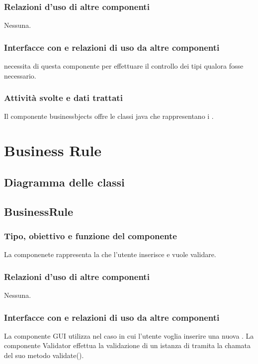\documentclass[11pt,titlepage,a4paper]{report}
\begin{document}
\subsubsection{Relazioni d'uso di altre componenti}
Nessuna.
\subsubsection{Interfacce con e relazioni di uso da altre componenti}
\brp necessita di questa componente per effettuare il controllo dei tipi qualora fosse necessario.
\subsubsection{Attivit\`a svolte e dati trattati}
Il componente businessbjects offre le classi java che rappresentano i \bos.%

\section{Business Rule}
\subsection{Diagramma delle classi}
\begin{center}
\end{center}
\subsection{BusinessRule}
\subsubsection{Tipo, obiettivo e funzione del componente}
La componenete \BR rappresenta la \br che l'utente inserisce e vuole validare.
\subsubsection{Relazioni d'uso di altre componenti}
Nessuna.
\subsubsection{Interfacce con e relazioni di uso da altre componenti}
La componente GUI utilizza \BR nel caso in cui l'utente voglia inserire una nuova \br.
La componente Validator effettua la validazione di un istanza di \BR tramita la chamata del suo metodo validate().
\end{document}
